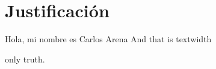 \section{Justificación}
\lipsum[1]

Hola, mi nombre es Carlos Arena
And that is textwidth

only truth.